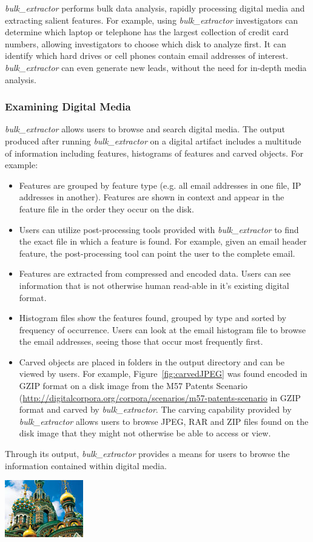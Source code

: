 \documentclass[DIV=calc, paper=a4, fontsize=11pt]{article}	 %
\newcommand \bulk {\textit{bulk\_extractor}\xspace}
\begin{document}
\noindent
\bulk performs bulk data analysis, rapidly processing digital media and extracting salient features. For example, using \bulk  investigators can determine which laptop or telephone has the largest collection of credit card numbers, allowing investigators to choose which disk to analyze first. It can identify which hard drives or cell phones contain email addresses of interest. \bulk can even generate new leads, without the need for in-depth media analysis\cite{digitalMediaTriage}.


\subsubsection*{Examining Digital Media}
\bulk allows users to browse and search digital media. The output produced after running \bulk on a digital artifact includes a multitude of information including features, histograms of features and carved objects. For example:
\begin{itemize}
\item Features are grouped by feature type (e.g. all email addresses in one file, IP addresses in another). Features are shown in context and appear in the feature file in the order they occur on the disk. 
\item Users can utilize post-processing tools provided with \bulk to find the exact file in which a feature is found.  For example, given an email header feature, the post-processing tool can point the user to the complete email.
\item Features are extracted from compressed and encoded data. Users can see information that is not otherwise human read-able in it's existing digital format. 
\item Histogram files show the features found, grouped by type and sorted by frequency of occurrence. Users can look at the email histogram file to browse the email addresses, seeing those that occur most frequently first.
\item Carved objects are placed in folders in the output directory and can be viewed by users. For example, Figure~\ref{fig:carvedJPEG} was found encoded in GZIP format on a disk image from the M57 Patents Scenario (\url{http://digitalcorpora.org/corpora/scenarios/m57-patents-scenario} in GZIP format and carved by \bulk. The carving capability provided by \bulk allows users to browse JPEG, RAR and ZIP files found on the disk image that they might not otherwise be able to access or view.
\end{itemize}
Through its output, \bulk provides a means for users to browse the information contained within digital media.
\begin{center}
	\includegraphics[scale=.80]{carvedJPEG.jpg}
	\label{fig:carvedJPEG}
\end{center}
\end{document}

